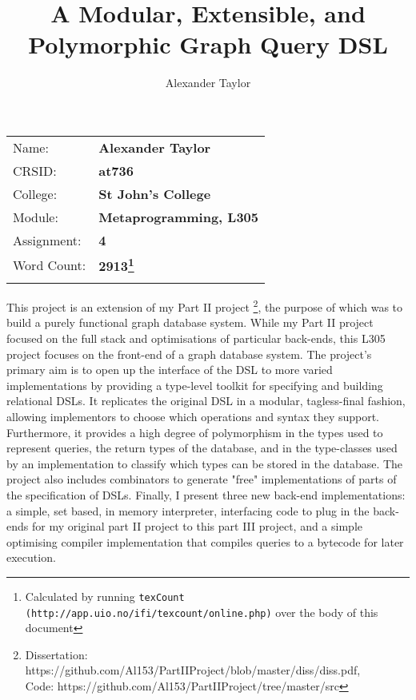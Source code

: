 \documentclass{report}
\newcommand \2[0]{\textbf{2}}
\newcommand \3[0]{\textbf{3}}
\begin{document}
\title{A Modular, Extensible, and Polymorphic Graph Query DSL}
\author{Alexander Taylor}

\maketitle
{\large
\begin{tabular}{p{5cm}p{8cm}}
Name:       & \bf Alexander Taylor      \\
CRSID:      & \bf at736 \\
College:    & \bf St John's College  \\
Module:     & \bf Metaprogramming, L305 \\
Assignment: & \bf 4 \\
Word Count: & \bf 2913\footnote{Calculated by running \texttt{texCount (http://app.uio.no/ifi/texcount/online.php)} over the body of this document}   \\
                   \\ 
\end{tabular}
}



\abstract
This project is an extension of my Part II project \footnote{Dissertation: https://github.com/Al153/PartIIProject/blob/master/diss/diss.pdf,\\ Code: https://github.com/Al153/PartIIProject/tree/master/src}, the purpose of which was to build a purely functional graph database system. While my Part II project focused on the full stack and optimisations of particular back-ends, this L305 project focuses on the front-end of a graph database system. The project's primary aim is to open up the interface of the DSL to more varied implementations by providing a type-level toolkit for specifying and building relational DSLs. It replicates the original DSL in a modular, tagless-final fashion, allowing implementors to choose which operations and syntax they support. Furthermore, it provides a high degree of polymorphism in the types used to represent queries, the return types of the database, and in the type-classes used by an implementation to classify which types can be stored in the database. The project also includes combinators to generate "free" implementations of parts of the specification of DSLs. Finally, I present three new back-end implementations: a simple, set based, in memory interpreter, interfacing code to plug in the back-ends for my original part II project to this part III project, and a simple optimising compiler implementation that compiles queries to a bytecode for later execution.
\end{document}
